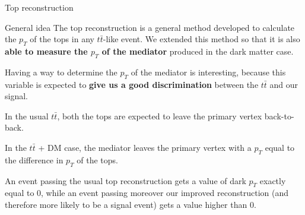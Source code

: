 \documentclass[8 pt]{beamer}
\begin{document}
\begin{frame}{Top reconstruction}

	\begin{block}{\vspace{5pt} General idea}
	\justifying
	\vspace{5pt}
	The top reconstruction is a general method developed to calculate the $p_T$ of the tops in any $t \bar t$-like event. We extended this method so that it is also \textbf{able to measure the $p_T$ of the mediator} produced in the dark matter case.\\ \vspace{8pt}
	\end{block} \vfill
	
	\justifying
	Having a way to determine the $p_T$ of the mediator is interesting, because this variable is expected to \textbf{give us a good discrimination} between the $t \bar t$ and our signal. \vfill
	
   \begin{minipage}[c]{.24\linewidth}
   \end{minipage} \hfill
   \begin{minipage}[c]{.24\linewidth}
   	\justifying
	In the usual $t \bar t$, both the tops are expected to leave the primary vertex back-to-back.
   \end{minipage} \hfill
   \begin{minipage}[c]{.24\linewidth}
   \end{minipage} \hfill
   \begin{minipage}[c]{.24\linewidth}
   	\justifying
	In the $t \bar t$ + DM case, the mediator leaves the primary vertex with a $p_T$ equal to the difference in $p_T$ of the tops.
   \end{minipage} \hfill \vfill

	\justifying
	An event passing the usual top reconstruction gets a value of dark $p_T$ exactly equal to 0, while an event passing moreover our improved reconstruction (and therefore more likely to be a signal event) gets a value higher than 0. \vfill

\end{frame}
\end{document}
